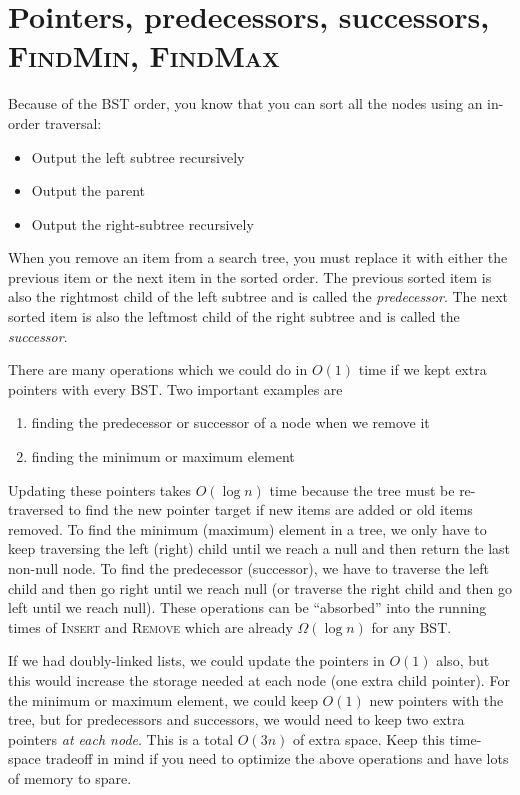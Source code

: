 \documentclass{article}[10pth]
\begin{document}
\section{Pointers, predecessors, successors, \textsc{FindMin}, \textsc{FindMax}}

Because of the BST order, you know that you can sort all the nodes using
an in-order traversal:

\begin{itemize}
\item Output the left subtree recursively
\item Output the parent
\item Output the right-subtree recursively
\end{itemize}

When you remove an item from a search tree, you must replace it with
either the previous item or the next item in the sorted order.
The previous sorted item is also the rightmost child of the left subtree
and is called the \textit{predecessor}.
The next sorted item is also the leftmost child of the right subtree
and is called the \textit{successor}.

There are many operations which we could do in $O(1)$ time if we kept
extra pointers with every BST. Two important examples are

\begin{enumerate}
\item finding the predecessor or successor of a node when we remove it
\item finding the minimum or maximum element
\end{enumerate}

Updating these pointers takes $O(\log{n})$ time because the tree must
be re-traversed to find the new pointer target if new items are added or
old items removed.
To find the minimum (maximum) element in a tree, we only have to keep
traversing the left (right) child until we reach a null and then return
the last non-null node.
To find the predecessor (successor), we have to traverse the left child and
then go right until we reach null (or traverse the right child and then go
left until we reach null).
These operations can be ``absorbed''
into the running times of \textsc{Insert} and \textsc{Remove} which are already
$\Omega(\log{n})$ for any BST.

If we had doubly-linked lists, we could update the pointers in $O(1)$ also,
but this would increase the storage needed at each node (one extra child
pointer). For the minimum or maximum element, we could keep $O(1)$ new
pointers with the tree, but for predecessors and successors, we would
need to keep two extra pointers \textit{at each node}. This is a total
$O(3n)$ of extra space. Keep this time-space tradeoff in mind if you need
to optimize the above operations and have lots of memory to spare.
 
\end{document}

